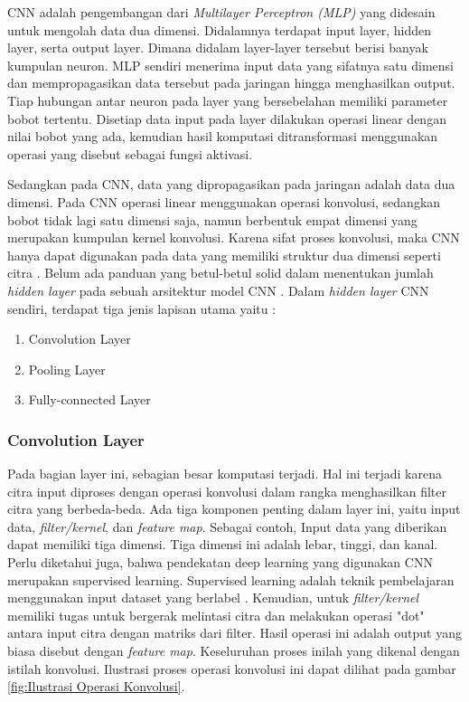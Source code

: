 CNN adalah pengembangan dari \emph{Multilayer Perceptron (MLP)} yang didesain untuk mengolah data dua dimensi. Didalamnya terdapat input layer, hidden layer, serta output layer. Dimana didalam layer-layer tersebut berisi banyak kumpulan neuron. MLP sendiri menerima input data yang sifatnya satu dimensi dan mempropagasikan data tersebut pada jaringan hingga menghasilkan output. Tiap hubungan antar neuron pada layer yang bersebelahan memiliki parameter bobot tertentu. Disetiap data input pada layer dilakukan operasi linear dengan nilai bobot yang ada, kemudian hasil komputasi ditransformasi menggunakan operasi yang disebut sebagai fungsi aktivasi. 

Sedangkan pada CNN, data yang dipropagasikan pada jaringan adalah data dua dimensi. Pada CNN operasi linear menggunakan operasi konvolusi, sedangkan bobot tidak lagi satu dimensi saja, namun berbentuk empat dimensi yang merupakan kumpulan kernel konvolusi. Karena sifat proses konvolusi, maka CNN hanya dapat digunakan pada data yang memiliki struktur dua dimensi seperti citra \parencite{IWayan2016}. Belum ada panduan yang betul-betul solid dalam menentukan jumlah \emph{hidden layer} pada sebuah arsitektur model CNN \parencite{MBernico}. Dalam \emph{hidden layer} CNN sendiri, terdapat tiga jenis lapisan utama yaitu :

\begin{enumerate}[nolistsep]
  \item Convolution Layer
  \item Pooling Layer
  \item Fully-connected Layer
\end{enumerate}

\subsubsection{Convolution Layer}
Pada bagian layer ini, sebagian besar komputasi terjadi. Hal ini terjadi karena citra input diproses dengan operasi konvolusi dalam rangka menghasilkan filter citra yang berbeda-beda. Ada tiga komponen penting dalam layer ini, yaitu input data, \emph{filter/kernel}, dan \emph{feature map}. Sebagai contoh, Input data yang diberikan dapat memiliki tiga dimensi. Tiga dimensi ini adalah lebar, tinggi, dan kanal. Perlu diketahui juga, bahwa pendekatan deep learning yang digunakan CNN merupakan supervised learning. Supervised learning adalah teknik pembelajaran menggunakan input dataset yang berlabel \parencite{MdZahangir}. Kemudian, untuk \emph{filter/kernel} memiliki tugas untuk bergerak melintasi citra dan melakukan operasi "dot" antara input citra dengan matriks dari filter. Hasil operasi ini adalah output yang biasa disebut dengan \emph{feature map}. Keseluruhan proses inilah yang dikenal dengan istilah konvolusi. Ilustrasi proses operasi konvolusi ini dapat dilihat pada gambar \ref{fig:Ilustrasi Operasi Konvolusi}.

